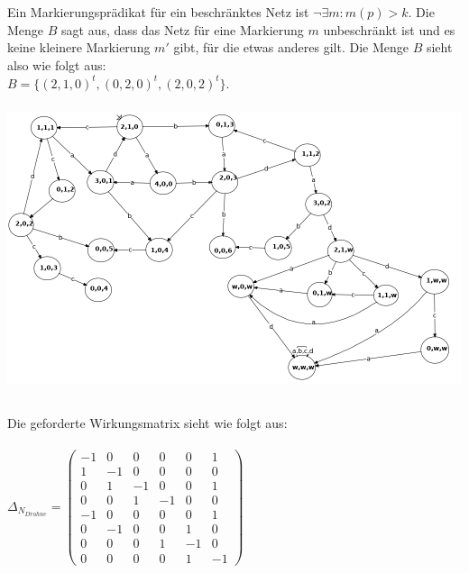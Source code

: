 \documentclass[a4paper,12pt]{scrartcl}
\title{\blatt}
\date{Gruppe 06}
\author{Sabrina Buczko 6663234, Julian Deinert 6535880, Rafael Heid 6704828}
\begin{document}
\maketitle
\newpage
\setcounter{section}{8}
\section{}
\setcounter{subsection}{2}
\subsection{}
\subsubsection{}
Ein Markierungsprädikat für ein beschränktes Netz ist $\neg\exists m:m(p)>k$.
Die Menge $B$ sagt aus, dass das Netz für eine Markierung
$m$ unbeschränkt ist und es keine kleinere
 Markierung $m'$ gibt, für die etwas anderes gilt. Die Menge $B$ sieht also wie folgt aus:\\
 $B = \{(2,1,0)^t,(0,2,0)^t,(2,0,2)^t\}$.
\subsubsection{}
\includegraphics[scale=0.5]{netz.png}
\subsection{}
\subsubsection{}
\subsubsection{}
Die geforderte Wirkungsmatrix sieht wie folgt aus:\\\\
$\Delta_{N_{Drohne}} = 
\begin{pmatrix}
-1 & 0 & 0 & 0 & 0 & 1\\
1 & -1 & 0 & 0 & 0 & 0\\
0 & 1 & -1 & 0 & 0 & 1\\
0 & 0 & 1 & -1 & 0 & 0\\
-1 & 0 & 0 & 0 & 0 & 1\\
0 & -1 & 0 & 0 & 1 & 0\\
0 & 0 & 0 & 1 & -1 & 0\\
0 & 0 & 0 & 0 & 1 & -1
\end{pmatrix}
$
\end{document}
